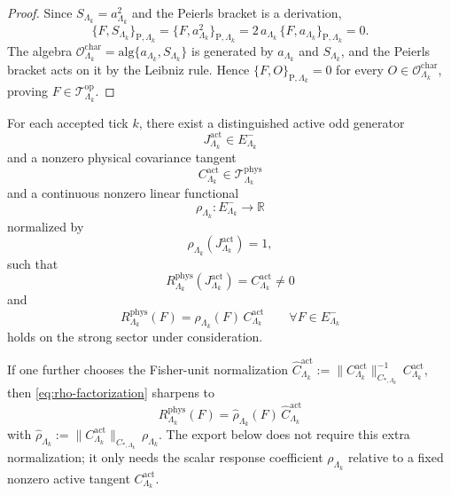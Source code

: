 \documentclass[11pt]{article}
\begin{document}
\begin{proof}
Since \(S_{\Lambda_k}=a_{\Lambda_k}^2\) and the Peierls bracket is a derivation,
\[
\{F,S_{\Lambda_k}\}_{\mathrm P,\Lambda_k}
=
\{F,a_{\Lambda_k}^2\}_{\mathrm P,\Lambda_k}
=
2\,a_{\Lambda_k}\,\{F,a_{\Lambda_k}\}_{\mathrm P,\Lambda_k}
=
0.
\]
The algebra \(\mathcal O^{\mathrm{char}}_{\Lambda_k}=\mathrm{alg}\{a_{\Lambda_k},S_{\Lambda_k}\}\)
is generated by \(a_{\Lambda_k}\) and \(S_{\Lambda_k}\), and the Peierls bracket acts on it by the
Leibniz rule. Hence \(\{F,O\}_{\mathrm P,\Lambda_k}=0\) for every
\(O\in\mathcal O^{\mathrm{char}}_{\Lambda_k}\), proving
\(F\in\mathcal T^{\mathrm{op}}_{\Lambda_k}\).
\end{proof}

\begin{assumption}
\label{ass:response-factorization}
For each accepted tick \(k\), there exist a distinguished active odd generator
\[
J^{\mathrm{act}}_{\Lambda_k}\in E^-_{\Lambda_k}
\]
and a nonzero physical covariance tangent
\[
C^{\mathrm{act}}_{\Lambda_k}\in \mathcal T^{\mathrm{phys}}_{\Lambda_k}
\]
and a continuous nonzero linear functional
\[
\rho_{\Lambda_k}:E^-_{\Lambda_k}\to\mathbb R
\]
normalized by
\[
\rho_{\Lambda_k}(J^{\mathrm{act}}_{\Lambda_k})=1,
\]
such that
\[
R^{\mathrm{phys}}_{\Lambda_k}(J^{\mathrm{act}}_{\Lambda_k})
=
C^{\mathrm{act}}_{\Lambda_k}
\neq 0
\]
and
\begin{equation}
R^{\mathrm{phys}}_{\Lambda_k}(F)
=
\rho_{\Lambda_k}(F)\,C^{\mathrm{act}}_{\Lambda_k}
\qquad
\forall F\in E^-_{\Lambda_k}
\label{eq:rho-factorization}
\end{equation}
holds on the strong sector under consideration.
\end{assumption}

\begin{remark}
\label{rem:rho-strong}
If one further chooses the Fisher-unit normalization
\(
\widehat C^{\mathrm{act}}_{\Lambda_k}
:=
\|C^{\mathrm{act}}_{\Lambda_k}\|^{-1}_{C_{\ast,\Lambda_k}}\,C^{\mathrm{act}}_{\Lambda_k},
\)
then
\eqref{eq:rho-factorization} sharpens to
\[
R^{\mathrm{phys}}_{\Lambda_k}(F)
=
\widehat{\rho}_{\Lambda_k}(F)\,\widehat C^{\mathrm{act}}_{\Lambda_k}
\]
with
\(
\widehat{\rho}_{\Lambda_k}
:=
\|C^{\mathrm{act}}_{\Lambda_k}\|_{C_{\ast,\Lambda_k}}\,\rho_{\Lambda_k}.
\)
The export below does not require this extra normalization; it only needs the scalar response
coefficient \(\rho_{\Lambda_k}\) relative to a fixed nonzero active tangent
\(C^{\mathrm{act}}_{\Lambda_k}\).
\end{remark}
\end{document}
